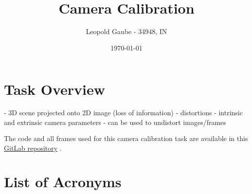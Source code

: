 \documentclass[bibliography=totoc]{scrartcl}
\title{Camera Calibration}
\author{Leopold Gaube - 34948, IN}
\date{\today}
\begin{document}
\maketitle
\tableofcontents

\clearpage

\section{Task Overview}

- 3D scene projected onto 2D image (loss of information)
- distortions
- intrinsic and extrinsic camera parameters
- can be used to undistort images/frames

\cite{OpenCV}
The code and all frames used for this camera calibration task are available in this \href{https://gitlab.com/gaubeleo/camera-calibration}{GitLab repository} \cite{Gitlab}.

\clearpage
\section*{List of Acronyms}



\end{document}
